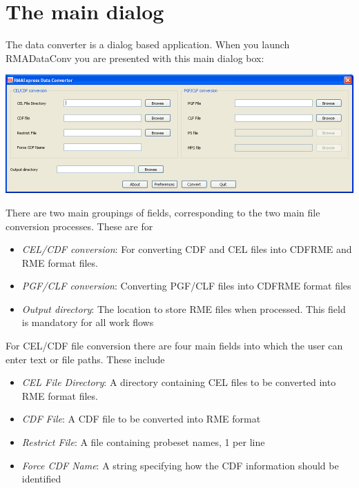 \documentclass[11pt]{report}
\begin{document}
\section{The main dialog}

The data converter is a dialog based application. When you launch RMADataConv you are presented with this main dialog box: 
\begin{center}
\includegraphics[scale=0.45]{DataConvertor.png}
\end{center}

There are two main groupings of fields, corresponding to the two main file conversion processes. These are for
\begin{itemize}
\item{\it CEL/CDF conversion}: For converting CDF and CEL files into CDFRME and RME format files.
\item{\it PGF/CLF conversion}: Converting PGF/CLF files into CDFRME format files
\end{itemize}

\begin{itemize}
\item {\it Output directory}: The location to store RME files when processed. This field is mandatory for all work flows
\end{itemize}

For CEL/CDF file conversion there are four main fields into which the user can enter text or file paths. These include
\begin{itemize}
\item {\it CEL File Directory}: A directory containing CEL files to be converted into RME format files.
\item {\it CDF File}: A CDF file to be converted into RME format
\item {\it Restrict File}: A file containing probeset names, 1 per line
\item {\it Force CDF Name}: A string specifying how the CDF information should be identified 
\end{itemize}
\end{document}
